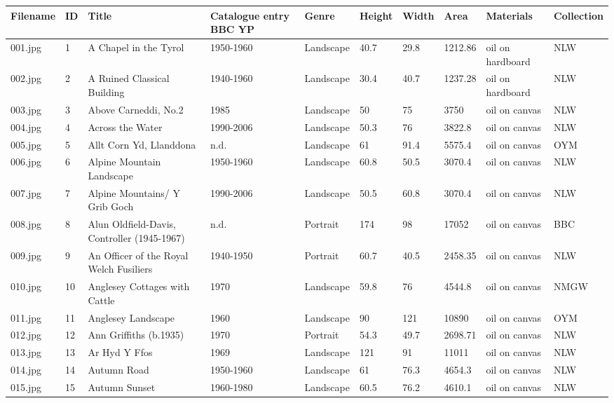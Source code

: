 \begin{landscape}
\begin{longtabu} to \linewidth {|X|X[-1.5]|X[2.5]|X[1.1]|X[1.1]|X[-1.3]|X[-1.3]|X|X[1.75]|X[1.5]|}\hline
\rowfont\bfseries Filename & ID & Title & Catalogue entry BBC YP & Genre & Height & Width & Area & Materials & Collection \\\hline
\endhead

001.jpg & 1 & A Chapel in the Tyrol & 1950-1960 & Landscape & 40.7 & 29.8 & 1212.86 & oil on hardboard & NLW \\\hline
002.jpg & 2 & A Ruined Classical Building & 1940-1960 & Landscape & 30.4 & 40.7 & 1237.28 & oil on hardboard & NLW \\\hline
003.jpg & 3 & Above Carneddi, No.2 & 1985 & Landscape & 50 & 75 & 3750 & oil on canvas & NLW \\\hline
004.jpg & 4 & Across the Water & 1990-2006 & Landscape & 50.3 & 76 & 3822.8 & oil on canvas & NLW \\\hline
005.jpg & 5 & Allt Corn Yd, Llanddona & n.d. & Landscape & 61 & 91.4 & 5575.4 & oil on canvas & OYM \\\hline
006.jpg & 6 & Alpine Mountain Landscape & 1950-1960 & Landscape & 60.8 & 50.5 & 3070.4 & oil on canvas & NLW \\\hline
007.jpg & 7 & Alpine Mountains/ Y Grib Goch & 1990-2006 & Landscape & 50.5 & 60.8 & 3070.4 & oil on canvas & NLW \\\hline
008.jpg & 8 & Alun Oldfield-Davis, Controller (1945-1967) & n.d. & Portrait & 174 & 98 & 17052 & oil on canvas & BBC \\\hline
009.jpg & 9 & An Officer of the Royal Welch Fusiliers & 1940-1950 & Portrait & 60.7 & 40.5 & 2458.35 & oil on canvas & NLW \\\hline
010.jpg & 10 & Anglesey Cottages with Cattle & 1970 & Landscape & 59.8 & 76 & 4544.8 & oil on canvas & NMGW \\\hline
011.jpg & 11 & Anglesey Landscape & 1960 & Landscape & 90 & 121 & 10890 & oil on canvas & OYM \\\hline
012.jpg & 12 & Ann Griffiths (b.1935) & 1970 & Portrait & 54.3 & 49.7 & 2698.71 & oil on canvas & NLW \\\hline
013.jpg & 13 & Ar Hyd Y Ffos & 1969 & Landscape & 121 & 91 & 11011 & oil on canvas & NLW \\\hline
014.jpg & 14 & Autumn Road & 1950-1960 & Landscape & 61 & 76.3 & 4654.3 & oil on canvas & NLW \\\hline
015.jpg & 15 & Autumn Sunset & 1960-1980 & Landscape & 60.5 & 76.2 & 4610.1 & oil on canvas & NLW \\\hline

\end{longtabu}
\end{landscape}

